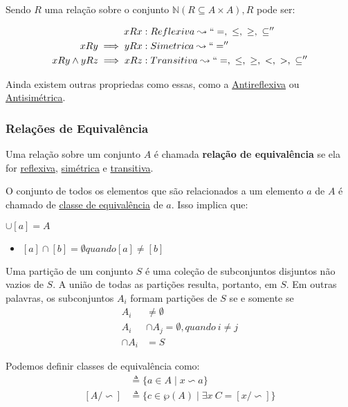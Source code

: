 \documentclass[12pt, a4paper]{article}
\begin{document}
Sendo $R$ uma relação sobre o conjunto $\mathbb{N} (R \subseteq A \times A), R$ pode ser:

\begin{align*}
x R x &: Reflexiva \leadsto `` =, ~\leq, ~\geq, ~\subseteq ''\\
x R y \implies  y R x  &: Simetrica \leadsto `` =  ''\\
x R y \land y R z \implies x R z &: Transitiva \leadsto  `` =, ~\leq, ~\geq, ~<, ~>, ~\subseteq ''
\end{align*}

Ainda existem outras propriedas como essas, como a \underline{Antireflexiva} ou \underline{Antisimétrica}.

\subsubsection{Relações de Equivalência}
Uma relação sobre um conjunto $A$ é chamada \textbf{relação de equivalência} se ela for \underline{reflexiva},
\underline{simétrica} e \underline{transitiva}.

O conjunto de todos os elementos que são relacionados a um elemento $a$ de $A$ é chamado de \underline{classe de equivalência} de $a$. Isso implica que:
\begin{center}
$\cup [a] = A$
\end{center}

\begin{itemize}
\item $[a] \cap [b] = \emptyset quando [a] \neq[b]$\\
\end{itemize}

Uma partição de um conjunto $S$ é uma coleção de subconjuntos disjuntos não vazios de $S$. A união de todas as partições resulta, portanto, em $S$. Em outras palavras, os subconjuntos $A_i$ formam partições de $S$ se e somente se\\
\begin{align*}
A_i &\neq \emptyset\\
A_i &\cap A_j = \emptyset, quando~i \neq j\\
\cap A_i &= S
\end{align*}

Podemos definir classes de equivalência como:\\
\begin{align*}
[x/\backsim] &\triangleq \{a \in A \mid x \backsim a \}\\
[A/\backsim] &\triangleq \{c \in \wp(A) \mid \exists x ~ C = [x/\backsim] \}
\end{align*}
\end{document}

